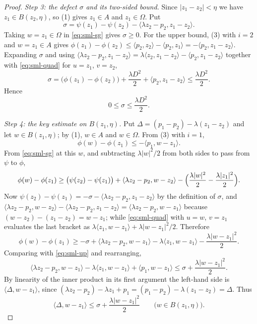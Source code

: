 \begin{proof}
\emph{Step 3: the defect $\sigma$ and its two-sided bound.}
Since $|z_1-z_2|<\eta$ we have $z_1\in B(z_2,\eta)$, so (1) gives
$z_1\in A$ and $z_1\in\Omega$. Put
\[
  \sigma=\psi(z_1)-\psi(z_2)-\langle\lambda z_2-p_2,z_1-z_2\rangle .
\]
Taking $w=z_1\in\Omega$ in \eqref{eq:sml-sg} gives $\sigma\ge0$. For the upper
bound, (3) with $i=2$ and $w=z_1\in A$ gives
$\phi(z_1)-\phi(z_2)\le\langle p_2,z_2\rangle-\langle p_2,z_1\rangle
=-\langle p_2,z_1-z_2\rangle$. Expanding $\sigma$ and using
$\langle\lambda z_2-p_2,z_1-z_2\rangle
=\lambda\langle z_2,z_1-z_2\rangle-\langle p_2,z_1-z_2\rangle$ together with
\eqref{eq:sml-quad} for $u=z_1$, $v=z_2$,
\[
  \sigma=\bigl(\phi(z_1)-\phi(z_2)\bigr)+\frac{\lambda D^2}{2}
         +\langle p_2,z_1-z_2\rangle
   \le\frac{\lambda D^2}{2}.
\]
Hence
\begin{equation}\label{eq:sml-sigma}
  0\le\sigma\le\frac{\lambda D^2}{2}.
\end{equation}

\emph{Step 4: the key estimate on $B(z_1,\eta)$.}
Put $\Delta=(p_1-p_2)-\lambda(z_1-z_2)$ and let $w\in B(z_1,\eta)$; by (1),
$w\in A$ and $w\in\Omega$. From (3) with $i=1$,
\begin{equation}\label{eq:sml-up}
  \phi(w)-\phi(z_1)\le-\langle p_1,w-z_1\rangle .
\end{equation}
From \eqref{eq:sml-sg} at this $w$, and subtracting $\lambda|w|^2/2$ from both
sides to pass from $\psi$ to $\phi$,
\[
  \phi(w)-\phi(z_1)
  \ge\bigl(\psi(z_2)-\psi(z_1)\bigr)+\langle\lambda z_2-p_2,w-z_2\rangle
    -\Bigl(\frac{\lambda|w|^2}{2}-\frac{\lambda|z_1|^2}{2}\Bigr).
\]
Now $\psi(z_2)-\psi(z_1)=-\sigma-\langle\lambda z_2-p_2,z_1-z_2\rangle$ by the
definition of $\sigma$, and
$\langle\lambda z_2-p_2,w-z_2\rangle-\langle\lambda z_2-p_2,z_1-z_2\rangle
=\langle\lambda z_2-p_2,w-z_1\rangle$ because $(w-z_2)-(z_1-z_2)=w-z_1$; while
\eqref{eq:sml-quad} with $u=w$, $v=z_1$ evaluates the last bracket as
$\lambda\langle z_1,w-z_1\rangle+\lambda|w-z_1|^2/2$. Therefore
\[
  \phi(w)-\phi(z_1)\ge-\sigma+\langle\lambda z_2-p_2,w-z_1\rangle
   -\lambda\langle z_1,w-z_1\rangle-\frac{\lambda|w-z_1|^2}{2}.
\]
Comparing with \eqref{eq:sml-up} and rearranging,
\[
  \langle\lambda z_2-p_2,w-z_1\rangle-\lambda\langle z_1,w-z_1\rangle
   +\langle p_1,w-z_1\rangle\le\sigma+\frac{\lambda|w-z_1|^2}{2}.
\]
By linearity of the inner product in its first argument the left-hand side is
$\langle\Delta,w-z_1\rangle$, since
$(\lambda z_2-p_2)-\lambda z_1+p_1=(p_1-p_2)-\lambda(z_1-z_2)=\Delta$. Thus
\begin{equation}\label{eq:sml-key}
  \langle\Delta,w-z_1\rangle\le\sigma+\frac{\lambda|w-z_1|^2}{2}
  \qquad\bigl(w\in B(z_1,\eta)\bigr).
\end{equation}


\end{proof}
